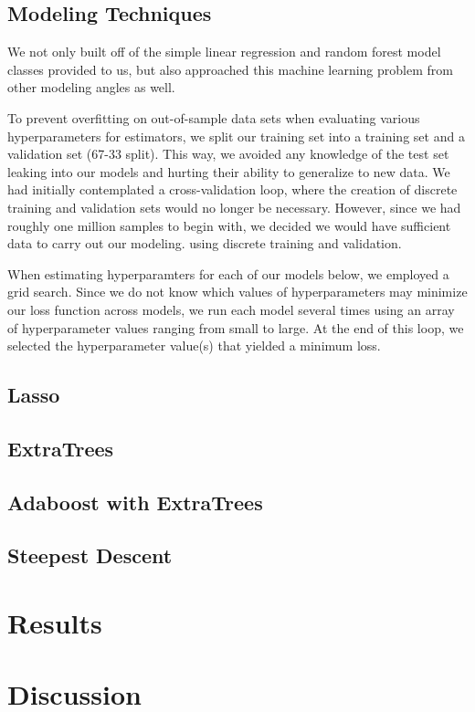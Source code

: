 \documentclass[11pt, oneside]{article}   	%
\begin{document}
\subsection{Modeling Techniques} 

We not only built off of the simple linear regression and random forest model classes provided to us, but also approached this machine learning problem from other modeling angles as well. 

To prevent overfitting on out-of-sample data sets when evaluating various hyperparameters for estimators, we split our training set into a training set and a validation set (67-33 split). This way, we avoided any knowledge of the test set leaking into our models and hurting their ability to generalize to new data. We had initially contemplated a cross-validation loop, where the creation of discrete training and validation sets would no longer be necessary. However, since we had roughly one million samples to begin with, we decided we would have sufficient data to carry out our modeling. using discrete training and validation.

When estimating hyperparamters for each of our models below, we employed a grid search. Since we do not know which values of hyperparameters may minimize our loss function across models, we run each model several times using an array of hyperparameter values ranging from small to large. At the end of this loop, we selected the hyperparameter value(s) that yielded a minimum loss. 

\subsection{Lasso} 

\subsection{ExtraTrees} 

\subsection{Adaboost with ExtraTrees} 
 
\subsection{Steepest Descent} 

\section{Results}

\section{Discussion}

\end{document}
